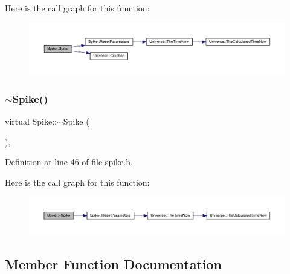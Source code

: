 Here is the call graph for this function\+:
\nopagebreak
\begin{figure}[H]
\begin{center}
\leavevmode
\includegraphics[width=350pt]{class_spike_afecf811f48103b529016a73349b50fe4_cgraph}
\end{center}
\end{figure}
\mbox{\label{class_spike_a6c2c62e81cb32ca4eb73bc686974d00d}} 
\subsubsection{\texorpdfstring{$\sim$\+Spike()}{~Spike()}}
{\footnotesize\ttfamily virtual Spike\+::$\sim$\+Spike (\begin{DoxyParamCaption}{ }\end{DoxyParamCaption})\hspace{0.3cm}{\ttfamily [inline]}, {\ttfamily [virtual]}}



Definition at line 46 of file spike.\+h.

Here is the call graph for this function\+:\nopagebreak
\begin{figure}[H]
\begin{center}
\leavevmode
\includegraphics[width=350pt]{class_spike_a6c2c62e81cb32ca4eb73bc686974d00d_cgraph}
\end{center}
\end{figure}


\subsection{Member Function Documentation}
\mbox{\label{class_spike_a6266871881a2581aaee499f6a10e1841}} 

